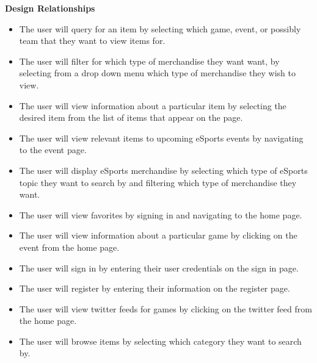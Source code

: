 \documentclass[onecolumn, draftclsnofoot,10pt, compsoc]{IEEEtran}
\begin{document}
       \textbf{Design Relationships}
       \begin{itemize}
       \item The user will query for an item by selecting which game, event, or possibly team that they want to view items for.
       \item The user will filter for which type of merchandise they want want, by selecting from a drop down menu which type of merchandise they wish to view.
       \item The user will view information about a particular item by selecting the desired item from the list of items that appear on the page. 
       \item The user will view relevant items to upcoming eSports events by navigating to the event page.
        \item The user will display eSports merchandise by selecting which type of eSports topic they want to search by and filtering which type of merchandise they want.
        \item The user will view favorites by signing in and navigating to the home page.
        \item The user will view information about a particular game by clicking on the event from the home page. 
        \item The user will sign in by entering their user credentials on the sign in page. 
        \item The user will register by entering their information on the register page. 
        \item The user will view twitter feeds for games by clicking on the twitter feed from the home page. 
        \item The user will browse items by selecting which category they want to search by. 
        \end{itemize}
         
\end{document}
